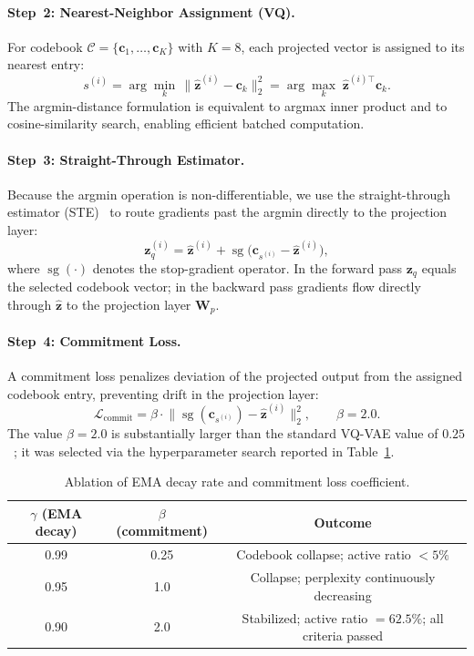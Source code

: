 \documentclass{article}
\begin{document}
\paragraph{Step~2: Nearest-Neighbor Assignment (VQ).}
For codebook $\mathcal{C} = \{\mathbf{c}_1, \ldots, \mathbf{c}_K\}$ with
$K = 8$, each projected vector is assigned to its nearest entry:
%
\begin{equation}
  s^{(i)}
  = \arg\min_{k}\,\|\hat{\mathbf{z}}^{(i)} - \mathbf{c}_k\|_2^2
  = \arg\max_{k}\;\hat{\mathbf{z}}^{(i)\top}\mathbf{c}_k.
\end{equation}
%
The argmin-distance formulation is equivalent to argmax inner product and to
cosine-similarity search, enabling efficient batched computation.

\paragraph{Step~3: Straight-Through Estimator.}
Because the argmin operation is non-differentiable, we use the
straight-through estimator (STE)~\cite{bengio2013estimating} to route
gradients past the argmin directly to the projection layer:
%
\begin{equation}
  \mathbf{z}_q^{(i)}
  = \hat{\mathbf{z}}^{(i)}
    + \operatorname{sg}\!\bigl(\mathbf{c}_{s^{(i)}} - \hat{\mathbf{z}}^{(i)}\bigr),
\end{equation}
%
where $\operatorname{sg}(\cdot)$ denotes the stop-gradient operator.
In the forward pass $\mathbf{z}_q$ equals the selected codebook vector; in the
backward pass gradients flow directly through $\hat{\mathbf{z}}$ to the
projection layer $\mathbf{W}_p$.

\paragraph{Step~4: Commitment Loss.}
A commitment loss penalizes deviation of the projected output from the assigned
codebook entry, preventing drift in the projection layer:
%
\begin{equation}
  \mathcal{L}_{\text{commit}}
  = \beta \cdot
    \bigl\|\operatorname{sg}(\mathbf{c}_{s^{(i)}})
           - \hat{\mathbf{z}}^{(i)}\bigr\|_2^2,
  \qquad \beta = 2.0.
\end{equation}
%
The value $\beta = 2.0$ is substantially larger than the standard VQ-VAE value
of $0.25$~\cite{oord2017neural}; it was selected via the hyperparameter search
reported in Table~\ref{tab:ablation}.

\begin{table}[H]
\centering
\caption{Ablation of EMA decay rate and commitment loss coefficient.}
\label{tab:ablation}
\begin{tabular}{ccc}
\toprule
$\gamma$ (EMA decay) & $\beta$ (commitment) & Outcome \\
\midrule
0.99 & 0.25 & Codebook collapse; active ratio $< 5\%$ \\
0.95 & 1.0  & Collapse; perplexity continuously decreasing \\
0.90 & 2.0  & Stabilized; active ratio $= 62.5\%$; all criteria passed \\
\bottomrule
\end{tabular}
\end{table}
\end{document}

